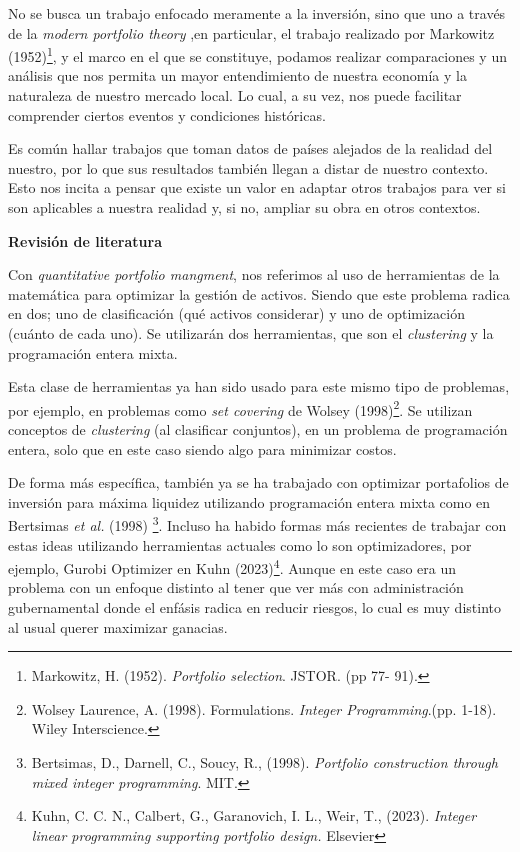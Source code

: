 \documentclass[
]{article}
\begin{document}
No se busca un trabajo enfocado meramente a la inversión, sino que uno 
a través de la \emph{modern portfolio theory} ,en particular, el
trabajo realizado por Markowitz (1952)\footnote{Markowitz, H. (1952). 
\emph{Portfolio selection}. JSTOR. (pp 77- 91).}, y el marco en el que 
se constituye,
podamos realizar comparaciones y un análisis que nos permita un mayor
entendimiento de nuestra economía y la naturaleza de nuestro mercado
local. Lo cual, a su vez, nos puede facilitar comprender ciertos
eventos y condiciones históricas.

Es común hallar trabajos que toman datos de países alejados de la
realidad del nuestro, por lo que sus resultados también llegan a distar
de nuestro contexto. Esto nos incita a pensar que existe un valor en
adaptar otros trabajos para ver si son aplicables a nuestra realidad y,
si no, ampliar su obra en otros contextos.

\textbf{Revisión de literatura}

Con \emph{quantitative portfolio mangment}, nos referimos al uso de
herramientas de la matemática para optimizar la gestión de activos.
Siendo que este problema radica en dos; uno de clasificación (qué
activos considerar) y uno de optimización (cuánto de cada uno). Se
utilizarán dos herramientas, que son el \emph{clustering} y la programación
entera mixta.

Esta clase de herramientas ya han sido usado para este mismo tipo de
problemas, por ejemplo, en problemas como \emph{set covering} de Wolsey
(1998)\footnote{Wolsey Laurence, A. (1998). Formulations. 
\emph{Integer Programming}.(pp. 1-18). Wiley Interscience.}. Se utilizan 
conceptos de \emph{clustering} (al clasificar conjuntos), en un problema 
de programación entera, solo que en este caso siendo algo para minimizar costos.

De forma más específica, también ya se ha trabajado con optimizar
portafolios de inversión para máxima liquidez utilizando programación
entera mixta como en Bertsimas \emph{et al.} (1998)
\footnote{Bertsimas, D., Darnell, C., Soucy, R., (1998). 
\emph{Portfolio construction through mixed integer programming}. MIT.}. 
Incluso ha habido formas más recientes de trabajar con estas ideas utilizando 
herramientas actuales como lo son optimizadores, por ejemplo, Gurobi Optimizer en
Kuhn (2023)\footnote{Kuhn, C. C. N., Calbert, G., Garanovich, I. L., Weir, T., 
(2023). \emph{Integer linear programming supporting portfolio design.} Elsevier}. 
Aunque en este caso era un problema con un enfoque distinto al tener que ver más 
con administración gubernamental donde el enfásis radica en reducir riesgos, lo 
cual es muy distinto al usual querer maximizar ganacias.
\end{document}
